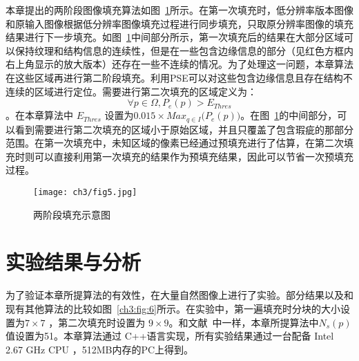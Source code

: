 本章提出的两阶段图像填充算法如图~\ref{ch3:fig:5}所示。在第一次填充时，低分辨率版本图像和原输入图像根据低分辨率图像填充过程进行同步填充，只取原分辨率图像的填充结果进行下一步填充。如图~\ref{ch3:fig:5}中间部分所示，第一次填充后的结果在大部分区域可以保持纹理和结构信息的连续性，但是在一些包含边缘信息的部分（见红色方框内右上角显示的放大版本）还存在一些不连续的情况。为了处理这一问题，本章算法在这些区域再进行第二阶段填充。利用PSE可以对这些包含边缘信息且存在结构不连续的区域进行定位。需要进行第二次填充的区域定义为： $$\forall p \in \Omega, P_e(p)>E_{Thres}$$。在本章算法中 \(E_{Thres}\) 设置为\(0.015 \times Max_{q\in{I}}{(P_e(p)})\)。在图~\ref{ch3:fig:5}的中间部分，可以看到需要进行第二次填充的区域小于原始区域，并且只覆盖了包含瑕疵的那部分范围。在第一次填充中，未知区域的像素已经通过预填充进行了估算，在第二次填充时则可以直接利用第一次填充的结果作为预填充结果，因此可以节省一次预填充过程。

\begin{figure}[!htbp]
\begin{center}
  \texttt{[image: ch3/fig5.jpg]}
\end{center}
\caption{两阶段填充示意图}
\label{ch3:fig:5}       %
\end{figure}

 \section{实验结果与分析}
 \label{cha3:results}
为了验证本章所提算法的有效性，在大量自然图像上进行了实验。部分结果以及和现有其他算法\cite{Criminisi04regionfilling,Xu:2010}的比较如图~\ref{ch3:fig:6}所示。在实验中，第一遍填充时分块的大小设置为\(7\times7\) ，第二次填充时设置为 \(9\times9\)。和文献~中一样，本章所提算法中\(N_s(p)\)值设置为51。本章算法通过 C++语言实现，所有实验结果通过一台配备  Intel 2.67 GHz CPU ，512MB内存的PC上得到。\par


